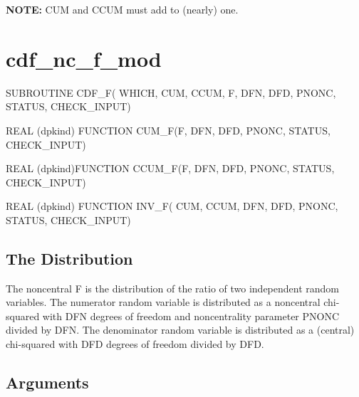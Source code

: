 \documentclass[12pt,dvips]{article}
\newcommand{\mysection}[1]{\color{blue}
             \section{#1} \normalcolor}
\newcommand{\mysubsection}[1] {\color{green}
             \subsection{#1} \normalcolor}
\begin{document}
{\bf NOTE:} CUM and CCUM  must add to (nearly) one.

\pagebreak

\mysection{cdf\_nc\_f\_mod}

\begin{description}

\item SUBROUTINE CDF\_F( WHICH, CUM, CCUM, F, DFN, DFD, PNONC,
STATUS, CHECK\_INPUT)

\item    REAL   (dpkind)   FUNCTION    CUM\_F(F,
DFN, DFD, PNONC, STATUS, CHECK\_INPUT)

\item    REAL    (dpkind)FUNCTION    CCUM\_F(F,
DFN, DFD, PNONC, STATUS, CHECK\_INPUT)

\item  REAL (dpkind) FUNCTION  INV\_F(  CUM, CCUM,
DFN, DFD, PNONC, STATUS, CHECK\_INPUT)

\end{description}

\mysubsection{The Distribution}

The noncentral F  is the distribution of the  ratio of two independent
random variables.   The numerator random variable is  distributed as a
noncentral chi-squared  with DFN  degrees of freedom  and noncentrality
parameter  PNONC divided by  DFN.  The  denominator random  variable is
distributed  as a (central)  chi-squared with  DFD degrees  of freedom
divided by DFD.

\mysubsection{Arguments}
\end{document}
